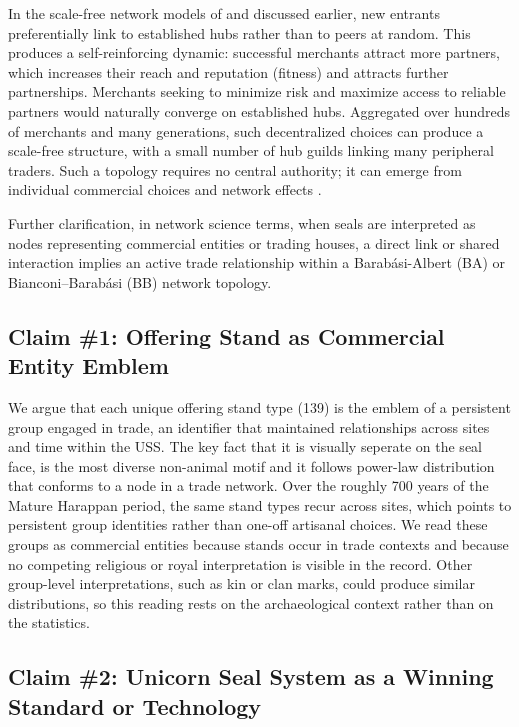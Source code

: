 \documentclass[12pt]{article}
\begin{document}
In the scale-free network models of \citet{barabasi1999emergence} and
\citet{bianconi2001competition} discussed earlier, new entrants preferentially
link to established hubs rather than to peers at random. This produces a
self-reinforcing dynamic: successful merchants attract more partners, which
increases their reach and reputation (fitness) and attracts further
partnerships. Merchants seeking to minimize risk and maximize access to reliable
partners would naturally converge on established hubs. Aggregated over hundreds
of merchants and many generations, such decentralized choices can produce a
scale-free structure, with a small number of hub guilds linking many peripheral
traders. Such a topology requires no central authority; it can emerge from
individual commercial choices and network effects
\citep{katz1985network,arthur1989competing}.

Further clarification, in network science terms, when seals are interpreted as nodes
representing commercial entities or trading houses, a direct link or shared interaction
implies an active trade relationship within a Barab{\'a}si-Albert (BA) or
Bianconi--Barab{\'a}si (BB) network topology.

\subsection{Claim \#1: Offering Stand as Commercial Entity Emblem}

We argue that each unique offering stand type (139) is the emblem of a
persistent group engaged in trade, an identifier that maintained relationships
across sites and time within the USS. The key fact that it is visually seperate
on the seal face, is the most diverse non-animal motif and it follows power-law
distribution that conforms to a node in a trade network. Over the roughly
700 years of the Mature Harappan period, the same stand types recur across sites,
which points to persistent group identities rather than one-off artisanal choices. We
read these groups as commercial entities because stands occur in trade contexts and
because no competing religious or royal interpretation is visible in the record. Other
group-level interpretations, such as kin or clan marks, could produce similar
distributions, so this reading rests on the archaeological context rather than on
the statistics.

\subsection{Claim \#2: Unicorn Seal System as a Winning Standard or Technology}
\end{document}
